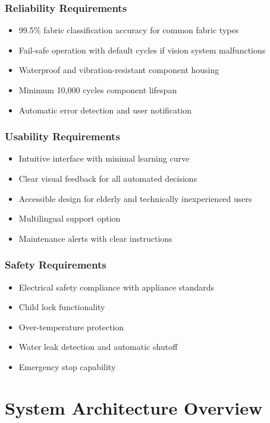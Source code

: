 \subsubsection{Reliability Requirements}
\begin{itemize}
    \item 99.5\% fabric classification accuracy for common fabric types
    \item Fail-safe operation with default cycles if vision system malfunctions
    \item Waterproof and vibration-resistant component housing
    \item Minimum 10,000 cycles component lifespan
    \item Automatic error detection and user notification
\end{itemize}

\subsubsection{Usability Requirements}
\begin{itemize}
    \item Intuitive interface with minimal learning curve
    \item Clear visual feedback for all automated decisions
    \item Accessible design for elderly and technically inexperienced users
    \item Multilingual support option
    \item Maintenance alerts with clear instructions
\end{itemize}

\subsubsection{Safety Requirements}
\begin{itemize}
    \item Electrical safety compliance with appliance standards
    \item Child lock functionality
    \item Over-temperature protection
    \item Water leak detection and automatic shutoff
    \item Emergency stop capability
\end{itemize}

\section{System Architecture Overview}


